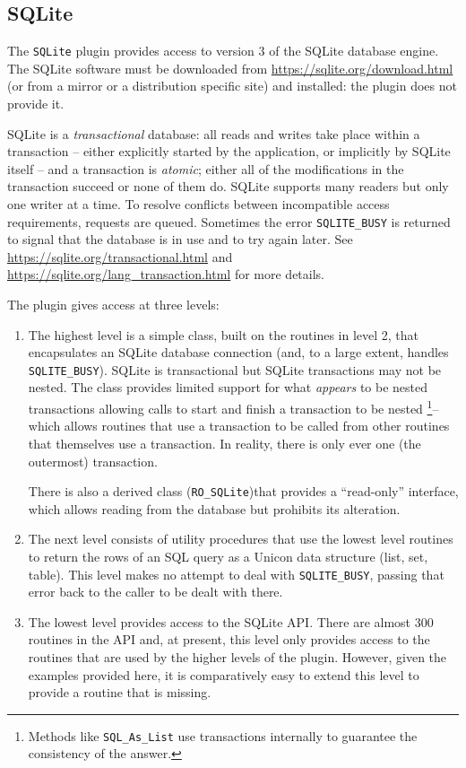 \subsection{SQLite}
\label{SQLitePlugin}
The \texttt{SQLite} plugin provides access to version 3 of the SQLite database
engine. The SQLite software must be downloaded from
\url{https://sqlite.org/download.html} (or from a mirror or a distribution specific
site) and installed: the plugin does not provide it.

SQLite is a {\em transactional\/} database: all reads and writes take place
within a transaction -- either explicitly started by the application, or
implicitly by SQLite itself -- and a transaction is {\em atomic\/}; either all
of the modifications in the transaction succeed or none of them do.  SQLite
supports many readers but only one writer at a time. To resolve conflicts
between incompatible access requirements, requests are queued. Sometimes the
error \texttt{SQLITE\_BUSY} is returned to signal that the database is in use
and to try again later.  See \url{https://sqlite.org/transactional.html} and
\url{https://sqlite.org/lang_transaction.html} for more details.

\medskip
{}
The plugin gives access at three levels:
\begin{enumerate}
\item
  The highest level is a simple class, built on the routines in level 2, that
  encapsulates an SQLite database connection (and, to a large extent, handles
  \texttt{SQLITE\_BUSY}).  SQLite is transactional but SQLite transactions may
  not be nested. The class provides limited support for what {\em appears\/} to
  be nested transactions allowing calls to start and finish a transaction to be
  nested%
  \footnote{
   Methods like \texttt{SQL\_As\_List} use transactions
   internally to guarantee the consistency of the answer.
  }-- which allows routines that use a transaction to be called from other
  routines that themselves use a transaction. In reality, there is only ever one
  (the outermost) transaction.

  There is also a derived class (\texttt{RO\_SQLite})that provides a
  ``read-only'' interface, which allows reading from the database but
  prohibits its alteration.
\item
  The next level consists of utility procedures that use the lowest level routines
  to return the rows of an SQL query as a Unicon data structure (list, set,
  table). This level makes no attempt to deal with \texttt{SQLITE\_BUSY},
  passing that error back to the caller to be dealt with there.
\item
  The lowest level provides access to the SQLite API. There are almost 300
  routines in the API and, at present, this level only provides access to the
  routines that are used by the higher levels of the plugin. However, given
  the examples provided here, it is comparatively easy to extend this level to
  provide a routine that is missing.
\end{enumerate}

